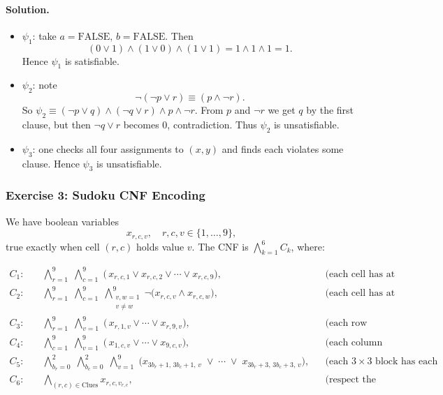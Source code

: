 \documentclass{article}
\theoremstyle{theorem}
\theoremstyle{definition}
\theoremstyle{remark}
\begin{document}
\paragraph{Solution.}
\begin{itemize}
  \item \(\psi_1\): take \(a=\mathrm{FALSE},\,b=\mathrm{FALSE}\).  Then
  \[
    (0\lor1)\land(1\lor0)\land(1\lor1)
    =1\land1\land1=1.
  \]
  Hence \(\psi_1\) is satisfiable.

  \item \(\psi_2\): note
  \[
    \neg(\neg p\lor r)\equiv(p\land\neg r).
  \]
  So \(\psi_2\equiv(\neg p\lor q)\land(\neg q\lor r)\land p\land\neg r\).
  From \(p\) and \(\neg r\) we get \(q\) by the first clause, but then
  \(\neg q\lor r\) becomes \(0\), contradiction.  Thus \(\psi_2\) is
  unsatisfiable.

  \item \(\psi_3\): one checks all four assignments to \((x,y)\) and finds
  each violates some clause.  Hence \(\psi_3\) is unsatisfiable.
\end{itemize}

\subsubsection*{Exercise 3: Sudoku CNF Encoding}  
We have boolean variables
\[
  x_{r,c,v},\quad
  r,c,v\in\{1,\dots,9\},
\]
true exactly when cell \((r,c)\) holds value \(v\).  The CNF is
\(\bigwedge_{k=1}^6 C_k\), where:

\[
\begin{aligned}
C_1{:}&\quad
\bigwedge_{r=1}^9\;\bigwedge_{c=1}^9\;\bigl(\,x_{r,c,1}\lor x_{r,c,2}\lor\cdots\lor x_{r,c,9}\bigr),
&&\text{(each cell has at least one value)}\\
C_2{:}&\quad
\bigwedge_{r=1}^9\;\bigwedge_{c=1}^9\;\bigwedge_{\substack{v,w=1\\v\neq w}}^9
\neg\bigl(x_{r,c,v}\land x_{r,c,w}\bigr),
&&\text{(each cell has at most one value)}\\
C_3{:}&\quad
\bigwedge_{r=1}^9\;\bigwedge_{v=1}^9\;\bigl(\,x_{r,1,v}\lor\cdots\lor x_{r,9,v}\bigr),
&&\text{(each row contains each value)}\\
C_4{:}&\quad
\bigwedge_{c=1}^9\;\bigwedge_{v=1}^9\;\bigl(\,x_{1,c,v}\lor\cdots\lor x_{9,c,v}\bigr),
&&\text{(each column contains each value)}\\
C_5{:}&\quad
\bigwedge_{b_r=0}^2\;\bigwedge_{b_c=0}^2\;\bigwedge_{v=1}^9
\;\bigl(x_{3b_r+1,\,3b_c+1,\,v}\;\lor\;\cdots\;\lor\;x_{3b_r+3,\,3b_c+3,\,v}\bigr),
&&\text{(each \(3\times3\) block has each value)}\\
C_6{:}&\quad
\bigwedge_{(r,c)\in\mathrm{Clues}}x_{r,c,v_{r,c}},
&&\text{(respect the given clues).}
\end{aligned}
\]
\end{document}
